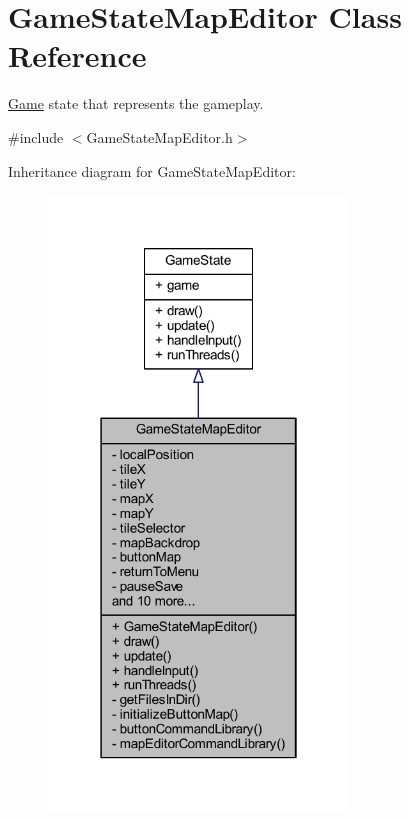 \hypertarget{class_game_state_map_editor}{\section{Game\+State\+Map\+Editor Class Reference}
\label{class_game_state_map_editor}
}


\hyperlink{class_game}{Game} state that represents the gameplay.  




{\ttfamily \#include $<$Game\+State\+Map\+Editor.\+h$>$}



Inheritance diagram for Game\+State\+Map\+Editor\+:
\nopagebreak
\begin{figure}[H]
\begin{center}
\leavevmode
\includegraphics[width=226pt]{class_game_state_map_editor__inherit__graph}
\end{center}
\end{figure}


